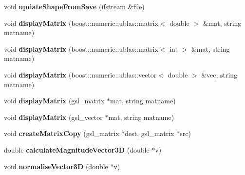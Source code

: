 \begin{DoxyCompactItemize}
\item 
\hypertarget{classShapeBase_ae5a4fc509efc12d24cf90ea71dee3c27}{}void {\bfseries update\+Shape\+From\+Save} (ifstream \&file)\label{classShapeBase_ae5a4fc509efc12d24cf90ea71dee3c27}

\item 
\hypertarget{classShapeBase_a488d30bfef98b1f1786d8d2b8ec17b99}{}void {\bfseries display\+Matrix} (boost\+::numeric\+::ublas\+::matrix$<$ double $>$ \&mat, string matname)\label{classShapeBase_a488d30bfef98b1f1786d8d2b8ec17b99}

\item 
\hypertarget{classShapeBase_a32973247ffcf77c2fd03f5d00c9fda42}{}void {\bfseries display\+Matrix} (boost\+::numeric\+::ublas\+::matrix$<$ int $>$ \&mat, string matname)\label{classShapeBase_a32973247ffcf77c2fd03f5d00c9fda42}

\item 
\hypertarget{classShapeBase_ae121abd34a8206b1f6e6829987ddf5c6}{}void {\bfseries display\+Matrix} (boost\+::numeric\+::ublas\+::vector$<$ double $>$ \&vec, string matname)\label{classShapeBase_ae121abd34a8206b1f6e6829987ddf5c6}

\item 
\hypertarget{classShapeBase_a51b06b089203d187455c97065ad57499}{}void {\bfseries display\+Matrix} (gsl\+\_\+matrix $\ast$mat, string matname)\label{classShapeBase_a51b06b089203d187455c97065ad57499}

\item 
\hypertarget{classShapeBase_af9a10295e67e1f9047d0800ec6b30b0c}{}void {\bfseries display\+Matrix} (gsl\+\_\+vector $\ast$mat, string matname)\label{classShapeBase_af9a10295e67e1f9047d0800ec6b30b0c}

\item 
\hypertarget{classShapeBase_a4b37ec963a6078a7e03512d23470c257}{}void {\bfseries create\+Matrix\+Copy} (gsl\+\_\+matrix $\ast$dest, gsl\+\_\+matrix $\ast$src)\label{classShapeBase_a4b37ec963a6078a7e03512d23470c257}

\item 
\hypertarget{classShapeBase_ac5d2cfe341eceb73f39d90955356f7b8}{}double {\bfseries calculate\+Magnitude\+Vector3\+D} (double $\ast$v)\label{classShapeBase_ac5d2cfe341eceb73f39d90955356f7b8}

\item 
\hypertarget{classShapeBase_afebf3d9e96e28e5272884f09b61eaab3}{}void {\bfseries normalise\+Vector3\+D} (double $\ast$v)\label{classShapeBase_afebf3d9e96e28e5272884f09b61eaab3}


\end{DoxyCompactItemize}
